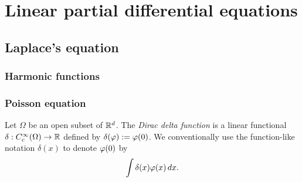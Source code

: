 \documentclass{../../large}
\begin{document}
\part{Linear partial differential equations}


\chapter{Laplace's equation}
\section{Harmonic functions}
\begin{prb}
\end{prb}
\begin{prb}
\end{prb}


\begin{prb}
\end{prb}
\begin{prb}
\end{prb}
\begin{prb}
\end{prb}

\section{Poisson equation}
\begin{prb}

\end{prb}
\begin{prb}
Let $\Omega$ be an open subset of $\mathbb{R}^d$.
The \emph{Dirac delta function} is a linear functional $\delta:C_c^\infty(\Omega)\to\mathbb{R}$ defined by $\delta(\varphi):=\varphi(0)$.
We conventionally use the function-like notation $\delta(x)$ to denote $\varphi(0)$ by
\[\int\delta(x)\varphi(x)\,dx.\]


\end{prb}
\end{document}
